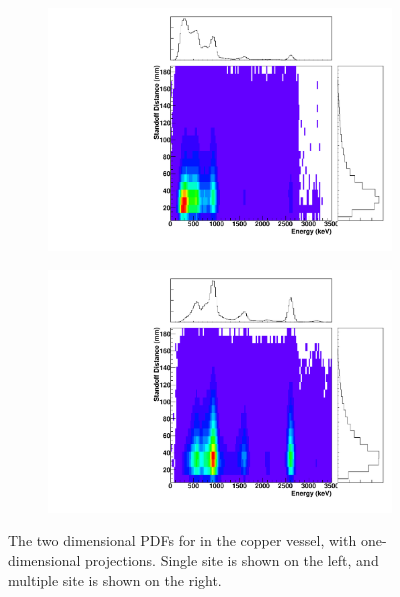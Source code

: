 \documentclass[herrin-thesis.tex]{subfiles}
\begin{document}
\begin{figure}[hp]
\centering
	\begin{subfigure}[b]{0.35\textwidth}
	\centering
	\includegraphics[width=\textwidth]{./plots/PDFs/analysis_pdf_AllVessel_Th232_ss.pdf}
\end{subfigure}\hspace{0.1\textwidth}%
\begin{subfigure}[b]{0.35\textwidth}
	\centering
	\includegraphics[width=1\textwidth]{./plots/PDFs/analysis_pdf_AllVessel_Th232_ms.pdf}
	\end{subfigure}
\caption[PDF for  in the TPC vessel]{The two dimensional PDFs for  in the copper vessel, with one-dimensional projections. Single site is shown on the left, and multiple site is shown on the right.}
\label{fig:analysis_pdf_AllVessel_Th232}
\end{figure}
\end{document}
